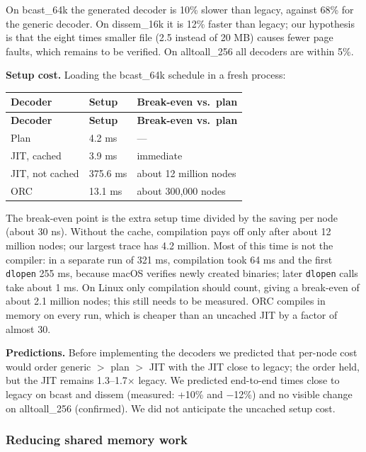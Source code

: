 \documentclass[10pt,a4paper]{article}
\begin{document}
On bcast\_64k the generated decoder is 10\% slower than legacy, against 68\% for the generic decoder. On dissem\_16k it is 12\% faster than legacy; our hypothesis is that the eight times smaller file (2.5 instead of 20 MB) causes fewer page faults, which remains to be verified. On alltoall\_256 all decoders are within 5\%.

\textbf{Setup cost.} Loading the bcast\_64k schedule in a fresh process:

{\small
\begin{longtable}{P{0.34\dimexpr{}\tabcolsep\relax}P{0.24\dimexpr{}\tabcolsep\relax}P{0.42\dimexpr{}\tabcolsep\relax}}
\toprule
\textbf{Decoder} & \textbf{Setup} & \textbf{Break-even vs.\ plan} \\
\midrule
\endfirsthead
\toprule
\textbf{Decoder} & \textbf{Setup} & \textbf{Break-even vs.\ plan} \\
\midrule
\endhead
\bottomrule
\endfoot
Plan & 4.2 ms & --- \\
JIT, cached & 3.9 ms & immediate \\
JIT, not cached & 375.6 ms & about 12 million nodes \\
ORC & 13.1 ms & about 300,000 nodes \\
\end{longtable}
}

The break-even point is the extra setup time divided by the saving per node (about 30 ns). Without the cache, compilation pays off only after about 12 million nodes; our largest trace has 4.2 million. Most of this time is not the compiler: in a separate run of 321 ms, compilation took 64 ms and the first \texttt{dlopen} 255 ms, because macOS verifies newly created binaries; later \texttt{dlopen} calls take about 1 ms. On Linux only compilation should count, giving a break-even of about 2.1 million nodes; this still needs to be measured. ORC compiles in memory on every run, which is cheaper than an uncached JIT by a factor of almost 30.

\textbf{Predictions.} Before implementing the decoders we predicted that per-node cost would order generic \(>\) plan \(>\) JIT with the JIT close to legacy; the order held, but the JIT remains 1.3--1.7\(\times\) legacy. We predicted end-to-end times close to legacy on bcast and dissem (measured: +10\% and \(-\)12\%) and no visible change on alltoall\_256 (confirmed). We did not anticipate the uncached setup cost.

\hypertarget{reducing-shared-memory-work}{}
\subsubsection{Reducing shared memory work}
\end{document}

